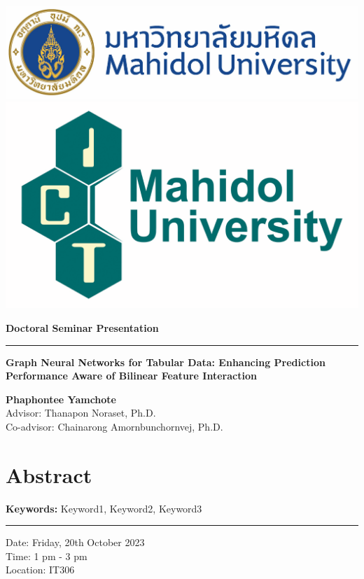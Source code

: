 \documentclass[a4paper,11pt]{article}
\begin{document}
	\graphicspath{ {figure/} }
	\includegraphics[scale=0.21]{Mahidol logo}
\hfill
	\includegraphics[scale=0.17]{ICT logo}
	\vspace{0.8cm}
	\begin{center}
		\textbf{\LARGE Doctoral Seminar Presentation}
	\end{center}
	\par\noindent\rule{\textwidth}{0.8pt}
\begin{spacing}{1.5}
	\begin{center}
		\textbf{\Large Graph Neural Networks for Tabular Data:
			Enhancing Prediction Performance Aware of Bilinear Feature Interaction}
	\end{center}
	\begin{center}
		\textbf{\large Phaphontee Yamchote}
		\\
		{\large Advisor: Thanapon Noraset, Ph.D.}
		\\
		{\large Co-advisor: Chainarong Amornbunchornvej, Ph.D.}
	\end{center}
	\section*{Abstract}
 \indent 
	\vspace{0.8cm}
	\noindent
	\textbf{Keywords:} Keyword1, Keyword2, Keyword3         
	
	\par\noindent\rule{\textwidth}{0.8pt}
	
	\noindent Date: Friday, 20th October 2023\\
	Time: 1 pm - 3 pm\\
	Location: IT306
	
\end{spacing}
	
\end{document}
